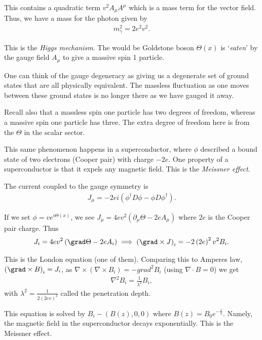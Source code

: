 This contains a quadratic term $v^2 A_\mu A^{\mu}$ which is a mass term for the vector field. Thus, we have a mass for the photon given by
\begin{align}
    m_\gamma^2 = 2 e^2v^2
.\end{align}

This is the \emph{Higgs mechanism}. The would be Goldstone boson $\Theta \left( x \right) $ is `\emph{eaten}' by the gauge field $A_\mu$ to give a massive spin 1 particle.

One can think of the gauge degeneracy as giving us a degenerate set of ground states that are all physically equivalent. The massless fluctuation as one moves between these ground states is no longer there as we have gauged it away.

Recall also that a massless spin one particle has two degrees of freedom, whereas a massive spin one particle has three. The extra degree of freedom here is from the $\Theta$ in the scalar sector.

This same phenomenon happens in a superconductor, where $\phi$ described a bound state of two electrons (Cooper pair) with charge $-2e$. One property of a superconductor is that it expels any magnetic field. This is the \emph{Meissner effect}.

The current coupled to the gauge symmetry is
\begin{align}
    J_\mu = -2e i\left( \phi^{\dag} D \phi - \phi D \phi^{\dag}   \right) 
.\end{align}

If we set $\phi = v e^{i \Theta \left( x \right) }$, we see $J_\mu = 4ev^2 \left( \partial_\mu \Theta - 2e A_\mu \right) $ where $2e$ is the Cooper pair charge. Thus
\begin{align}
    J_i = 4 ev^2 \left( \grad \Theta - 2e A_i \right) \implies \left( \grad \times J \right)_i  = -2 \left( 2e \right)^2 v^2 B_i
.\end{align}

This is the London equation (one of them). Comparing this to Amperes law, $\left( \grad \times  B \right)_i  = J_i$, as $\nabla \times  \left( \nabla \times B_i \right) = - grad^2 B_i$ (using $\nabla \cdot B = 0$) we get
\begin{align}
    \nabla^2 B_i = \frac{1}{\lambda^2} B_i
,\end{align}
with $\lambda^2 = \frac{1}{2 \left( 2 ev \right)^2}$ called the penetration depth.

This equation is solved by $B_i - \left( B\left( z \right) ,0,0 \right) $ where $B\left( z \right) = B_0 e^{-\frac{z}{\lambda}}$. Namely, the magnetic field in the superconductor decays exponentially. This is the Meissner effect.

